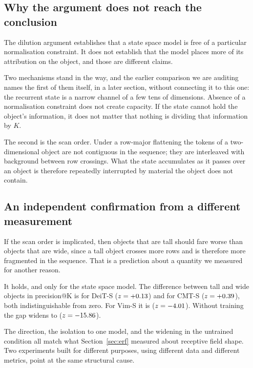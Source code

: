 \subsection{Why the argument does not reach the conclusion}

The dilution argument establishes that a state space model is free of a
particular normalisation constraint. It does not establish that the model
places more of its attribution on the object, and those are different claims.

Two mechanisms stand in the way, and the earlier comparison we are auditing
names the first of them itself, in a later section, without connecting it to
this one: the recurrent state is a narrow channel of a few tens of
dimensions. Absence of a normalisation constraint does not create capacity.
If the state cannot hold the object's information, it does not matter that
nothing is dividing that information by $K$.

The second is the scan order. Under a row-major flattening the tokens of a
two-dimensional object are not contiguous in the sequence; they are
interleaved with background between row crossings. What the state
accumulates as it passes over an object is therefore repeatedly interrupted
by material the object does not contain.

\subsection{An independent confirmation from a different measurement}

If the scan order is implicated, then objects that are tall should fare worse
than objects that are wide, since a tall object crosses more rows and is
therefore more fragmented in the sequence. That is a prediction about a
quantity we measured for another reason.

It holds, and only for the state space model. The difference between tall and
wide objects in precision@K is \DeitTallWide{} for DeiT-S ($z =
+0.13{}$) and \CmtTallWide{} for CMT-S ($z = +0.39{}$),
both indistinguishable from zero. For Vim-S it is \VimTallWide{} ($z =
-4.01{}$). Without training the gap widens to
\VimTallWideRandom{} ($z = -15.86{}$).

The direction, the isolation to one model, and the widening in the untrained
condition all match what Section~\ref{sec:erf} measured about receptive field
shape. Two experiments built for different purposes, using different data and
different metrics, point at the same structural cause.
